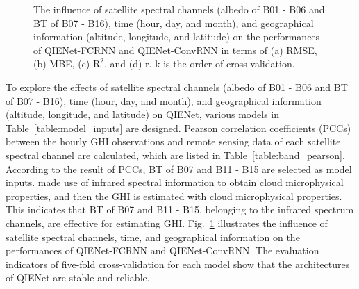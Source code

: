 \documentclass[review]{elsarticle}
\begin{document}
\begin{figure}[!htbp]
    \centering
    \caption{The influence of satellite spectral channels (albedo of B01 - B06 and BT of B07 - B16), time (hour, day, and month), and geographical information (altitude, longitude, and latitude) on the performances of QIENet-FCRNN and QIENet-ConvRNN in terms of (a) RMSE, (b) MBE, (c) $\mathrm{R^2}$, and (d) $\mathrm{r}$. $\mathrm{k}$ is the order of cross validation.}
    \label{fig:FCRNN_ConvRNN_Test_Index}
\end{figure}

To explore the effects of satellite spectral channels (albedo of B01 - B06 and BT of B07 - B16), time (hour, day, and month), and geographical information (altitude, longitude, and latitude) on QIENet, various models in Table~\ref{table:model_inputs} are designed.
Pearson correlation coefficients (PCCs) between the hourly GHI observations and remote sensing data of each satellite spectral channel are calculated, which are listed in Table~\ref{table:band_pearson}.
According to the result of PCCs, BT of B07 and B11 - B15 are selected as model inputs.
\citet{TANA2023113548} made use of infrared spectral information to obtain cloud microphysical properties, and then the GHI is estimated with cloud microphysical properties.
This indicates that BT of B07 and B11 - B15, belonging to the infrared spectrum channels, are effective for estimating GHI.
Fig.~\ref{fig:FCRNN_ConvRNN_Test_Index} illustrates the influence of satellite spectral channels, time, and geographical information on the performances of QIENet-FCRNN and QIENet-ConvRNN.
The evaluation indicators of five-fold cross-validation for each model show that the architectures of QIENet are stable and reliable.
\end{document}

